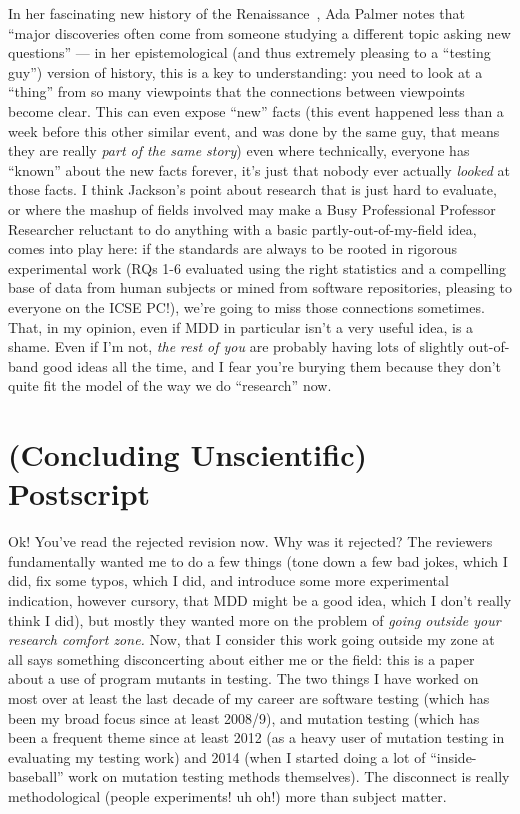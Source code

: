 \documentclass[sigplan,screen]{acmart}
\begin{document}
In her fascinating new history of the Renaissance~\cite{palmer}, Ada
Palmer notes that ``major discoveries often come from someone studying
a different topic asking new questions'' --- in her epistemological
(and thus extremely pleasing to a ``testing guy'') version of history,
this is a key to understanding:  you need to look at a ``thing'' from so many
viewpoints that the connections between viewpoints become clear.  This
can even expose ``new''
facts (this event happened less than a week before
this other similar event, and was done by the same guy, that means
they are really \emph{part of the same story}) even where technically,
everyone has ``known'' about the new facts forever, it's just that
nobody ever actually \emph{looked} at those facts.  I think Jackson's
point about research that is just hard to evaluate, or where the mashup of fields
involved may make a Busy Professional Professor Researcher reluctant
to do anything with a basic partly-out-of-my-field idea, comes into play here:  if the standards are
always to be rooted in rigorous experimental work (RQs 1-6 evaluated
using the right statistics and a compelling base of data from human
subjects or mined from software repositories, pleasing to everyone on
the ICSE PC!), we're going to miss those connections sometimes.
That, in my opinion, even if MDD in particular isn't a very useful
idea, is a shame.  Even if I'm not, \emph{the rest of you} are probably having lots of
slightly out-of-band good ideas all the time, and I fear you're
burying them because they don't quite fit the model of the way we do
``research'' now.

\section{(Concluding Unscientific) Postscript}

Ok!  You've read the rejected revision now.  Why was it rejected?  The
reviewers fundamentally wanted me to do a few things (tone down a few
bad jokes, which I did, fix some typos, which I did, and introduce
some more experimental indication, however cursory, that MDD might be
a good idea, which I don't really think I did), but mostly they wanted
more on the problem of \emph{going outside your research comfort
  zone.}  Now, that I consider this work going outside my zone at all
says something disconcerting about either me or the field:  this is a
paper about a use of program mutants in testing.  The two things I
have worked on most over at least the last decade of my career are
software testing (which has been my broad focus since at least 2008/9), and
mutation testing (which has been a frequent theme since at least 2012
(as a heavy user of mutation testing in evaluating my testing work)
and 2014 (when I started doing a lot of ``inside-baseball'' work on
mutation testing methods themselves).  The disconnect is really
methodological (people experiments!  uh oh!) more than subject matter.
\end{document}
